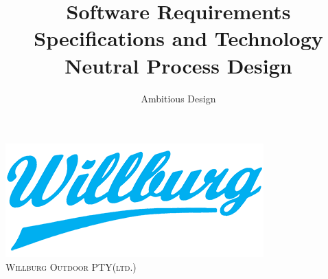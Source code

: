\documentclass[a4paper,12pt]{report}
\author{Ambitious Design}
\title{Software Requirements Specifications and Technology Neutral Process Design}
\begin{document}
\setlength{\parskip}{6pt}

\begin{titlepage}

\begin{center}

\includegraphics{../Images/willburg.png}\\
\textsc{\LARGE Willburg Outdoor PTY(ltd.)}\\[1.5cm]


\end{center}
\end{titlepage}
\end{document}
